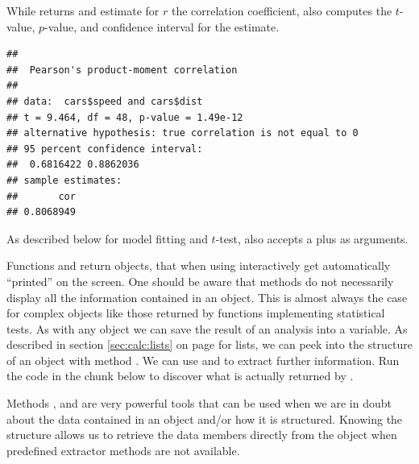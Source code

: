 \documentclass[krantz2]{krantz}\usepackage{knitr}
\begin{document}
While  returns and estimate for $r$ the correlation coefficient,  also computes the $t$-value, $p$-value, and confidence interval for the estimate.

\begin{knitrout}\footnotesize
{}\color{fgcolor}\begin{kframe}
\begin{alltt}
\hlstd{(} \hlopt{$}  \hlopt{$}
\end{alltt}
\begin{verbatim}
##
## 	Pearson's product-moment correlation
##
## data:  cars$speed and cars$dist
## t = 9.464, df = 48, p-value = 1.49e-12
## alternative hypothesis: true correlation is not equal to 0
## 95 percent confidence interval:
##  0.6816422 0.8862036
## sample estimates:
##       cor
## 0.8068949
\end{verbatim}
\end{kframe}
\end{knitrout}

As described below for model fitting and $t$-test,  also accepts a  plus  as arguments.

\begin{playground}
Functions  and  return \Rlang objects, that when using \Rlang interactively get automatically ``printed'' on the screen. One should be aware that  methods do not necessarily display all the information contained in an \Rlang object. This is almost always the case for complex objects like those returned by \Rlang functions implementing statistical tests. As with any \Rlang object we can save the result of an analysis into a variable. As described in section \ref{sec:calc:lists} on page \pageref{sec:calc:lists} for lists, we can peek into the structure of an object with method . We can use  and  to extract further information. Run the code in the chunk below to discover what is actually returned by .

\begin{knitrout}\footnotesize
{}\color{fgcolor}\begin{kframe}
\begin{alltt}
 \hlkwb{<-} 
\end{alltt}
\end{kframe}
\end{knitrout}

Methods ,  and  are very powerful tools that can be used when we are in doubt about the data contained in an object and/or how it is structured. Knowing the structure allows us to retrieve the data members directly from the object when predefined extractor methods are not available.
\end{playground}
\end{document}
